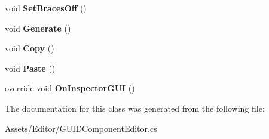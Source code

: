 \begin{DoxyCompactItemize}
\item 
\hypertarget{class_hattori_game2_1_1_core_1_1_components_1_1_g_u_i_d_component_editor_a7b259d6e23fea9ef5174fdcbf8d9186d}{}void {\bfseries Set\+Braces\+Off} ()\label{class_hattori_game2_1_1_core_1_1_components_1_1_g_u_i_d_component_editor_a7b259d6e23fea9ef5174fdcbf8d9186d}

\item 
\hypertarget{class_hattori_game2_1_1_core_1_1_components_1_1_g_u_i_d_component_editor_af17528988b7c3d8793f0b469bf201940}{}void {\bfseries Generate} ()\label{class_hattori_game2_1_1_core_1_1_components_1_1_g_u_i_d_component_editor_af17528988b7c3d8793f0b469bf201940}

\item 
\hypertarget{class_hattori_game2_1_1_core_1_1_components_1_1_g_u_i_d_component_editor_a482c03ecf2d556e6c974d31be5f29c3e}{}void {\bfseries Copy} ()\label{class_hattori_game2_1_1_core_1_1_components_1_1_g_u_i_d_component_editor_a482c03ecf2d556e6c974d31be5f29c3e}

\item 
\hypertarget{class_hattori_game2_1_1_core_1_1_components_1_1_g_u_i_d_component_editor_ae6c62c2f672db7a0e23413e18dcb07be}{}void {\bfseries Paste} ()\label{class_hattori_game2_1_1_core_1_1_components_1_1_g_u_i_d_component_editor_ae6c62c2f672db7a0e23413e18dcb07be}

\item 
\hypertarget{class_hattori_game2_1_1_core_1_1_components_1_1_g_u_i_d_component_editor_a1688c15e0a7d3c051b154f29a21f206d}{}override void {\bfseries On\+Inspector\+G\+U\+I} ()\label{class_hattori_game2_1_1_core_1_1_components_1_1_g_u_i_d_component_editor_a1688c15e0a7d3c051b154f29a21f206d}

\end{DoxyCompactItemize}


The documentation for this class was generated from the following file\+:\begin{DoxyCompactItemize}
\item 
Assets/\+Editor/G\+U\+I\+D\+Component\+Editor.\+cs\end{DoxyCompactItemize}
